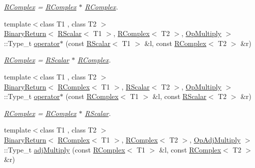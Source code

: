 \begin{DoxyCompactItemize}
\begin{DoxyCompactList}\small\item\em \mbox{\hyperlink{classENSEM_1_1RComplex}{R\+Complex}} = \mbox{\hyperlink{classENSEM_1_1RComplex}{R\+Complex}} $\ast$ \mbox{\hyperlink{classENSEM_1_1RComplex}{R\+Complex}}. \end{DoxyCompactList}\item 
{\footnotesize template$<$class T1 , class T2 $>$ }\\\mbox{\hyperlink{structENSEM_1_1BinaryReturn}{Binary\+Return}}$<$ \mbox{\hyperlink{classENSEM_1_1RScalar}{R\+Scalar}}$<$ T1 $>$, \mbox{\hyperlink{classENSEM_1_1RComplex}{R\+Complex}}$<$ T2 $>$, \mbox{\hyperlink{structENSEM_1_1OpMultiply}{Op\+Multiply}} $>$\+::Type\+\_\+t \mbox{\hyperlink{group__rcomplex_ga0d32e4173e14565f942b2e42ede11659}{operator$\ast$}} (const \mbox{\hyperlink{classENSEM_1_1RScalar}{R\+Scalar}}$<$ T1 $>$ \&l, const \mbox{\hyperlink{classENSEM_1_1RComplex}{R\+Complex}}$<$ T2 $>$ \&r)
\begin{DoxyCompactList}\small\item\em \mbox{\hyperlink{classENSEM_1_1RComplex}{R\+Complex}} = \mbox{\hyperlink{classENSEM_1_1RScalar}{R\+Scalar}} $\ast$ \mbox{\hyperlink{classENSEM_1_1RComplex}{R\+Complex}}. \end{DoxyCompactList}\item 
{\footnotesize template$<$class T1 , class T2 $>$ }\\\mbox{\hyperlink{structENSEM_1_1BinaryReturn}{Binary\+Return}}$<$ \mbox{\hyperlink{classENSEM_1_1RComplex}{R\+Complex}}$<$ T1 $>$, \mbox{\hyperlink{classENSEM_1_1RScalar}{R\+Scalar}}$<$ T2 $>$, \mbox{\hyperlink{structENSEM_1_1OpMultiply}{Op\+Multiply}} $>$\+::Type\+\_\+t \mbox{\hyperlink{group__rcomplex_gad99c4b787d010bff9c7b17d7c88e597a}{operator$\ast$}} (const \mbox{\hyperlink{classENSEM_1_1RComplex}{R\+Complex}}$<$ T1 $>$ \&l, const \mbox{\hyperlink{classENSEM_1_1RScalar}{R\+Scalar}}$<$ T2 $>$ \&r)
\begin{DoxyCompactList}\small\item\em \mbox{\hyperlink{classENSEM_1_1RComplex}{R\+Complex}} = \mbox{\hyperlink{classENSEM_1_1RComplex}{R\+Complex}} $\ast$ \mbox{\hyperlink{classENSEM_1_1RScalar}{R\+Scalar}}. \end{DoxyCompactList}\item 
{\footnotesize template$<$class T1 , class T2 $>$ }\\\mbox{\hyperlink{structENSEM_1_1BinaryReturn}{Binary\+Return}}$<$ \mbox{\hyperlink{classENSEM_1_1RComplex}{R\+Complex}}$<$ T1 $>$, \mbox{\hyperlink{classENSEM_1_1RComplex}{R\+Complex}}$<$ T2 $>$, \mbox{\hyperlink{structENSEM_1_1OpAdjMultiply}{Op\+Adj\+Multiply}} $>$\+::Type\+\_\+t \mbox{\hyperlink{group__rcomplex_ga0ee080478b142a857cd13cd07d2e17dd}{adj\+Multiply}} (const \mbox{\hyperlink{classENSEM_1_1RComplex}{R\+Complex}}$<$ T1 $>$ \&l, const \mbox{\hyperlink{classENSEM_1_1RComplex}{R\+Complex}}$<$ T2 $>$ \&r)

\end{DoxyCompactItemize}
